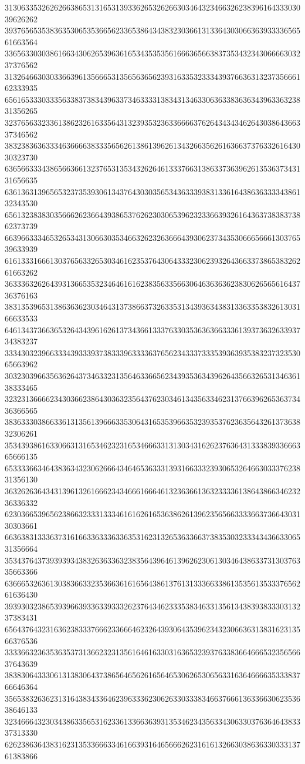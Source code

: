 31306335326262663865313165313933626532626630346432346632623839616433303039626262
39376565353836353065353665623365386434383230366131336430306636393333656561663564
33656330303861663430626539636165343535356166636566383735343234306666303237376562
31326466303033663961356665313565636562393163353233343937663631323735666162333935
65616533303335633837383439633734633331383431346330636338363634396336323831356265
32376563323361386232616335643132393532363366663762643434346264303864366337346562
38323836363334636666383335656261386139626134326635626163663737633261643030323730
63656633343865663661323765313534326264613337663138633736396261353637343131656635
63613631396565323735393061343764303035653436333938313361643863633334386132343530
65613238383035666262366439386537626230306539623233663932616436373838373862373739
66396633346532653431306630353466326232636664393062373435306665666130376539633939
61613331666130376563326530346162353764306433323062393264366337386538326261663262
36333632626439313665353234646161623835633566306463636362383062656561643736376163
38313539653138636362303464313738663732633531343936343831336335383261303166633533
64613437366365326434396162613734366133376330353636366333613937363263393734383237
33343032396633343933393738333963333637656234333733353936393538323732353065663962
30323039663563626437346332313564633665623439353634396264356632653134636138333465
32323136666234303662386430363235643762303461343563346231376639626536373436366565
38363330386633613135613966633530643165353966353239353762363564326137363832306261
35343938616330663131653462323165346663313130343162623763643133383933666365666135
65333366346438363432306266643464653633313931663332393065326466303337623831356130
36326263643431396132616662343466616664613236366136323333613864386634623236336332
62303665396562386632333133346161626165363862613962356566333366373664303130303661
66363831333637316166336333633635316231326536336637383530323334343663306531356664
35343764373939393438326363363238356439646139626230613034643863373130376335663366
63666532636130383663323536636161656438613761313336633861353561353337656261636430
39393032386539396639336339333262376434623335383463313561343839383330313237383431
65643764323163623833376662336664623264393064353962343230663631383162313566376536
33336632363536353731366232313561646163303163653239376338366466653235656637643639
38383064333061313830643738656465626165646530626530656331636466663533383766646364
35653832636231316438343364623963336230626330333834663766613633663062353638646133
32346664323034386335653162336133663639313534623435633430633037636464383337313330
62623863643831623135336663346166393164656662623161613266303863633033313761383866
